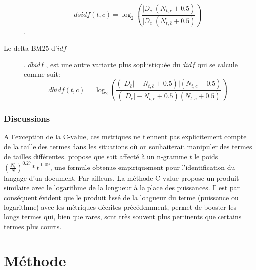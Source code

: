\begin{description}
    \[dsidf(t,c) = \log_2\left(\frac{\vert D_{\overline{c}} \vert (N_{t,c} + 0.5)}{\vert D_c \vert (N_{t,\overline{c}} + 0.5)}\right)\].
    \item[Le delta BM25 d'$idf$], $dbidf$ \citep{paltoglou2010dsidfANDdbidf}, est une autre variante plus sophistiquée du $didf$ qui se calcule comme suit:
    \[dbidf(t,c) = \log_2\left(\frac{( \vert D_{\overline{c}} \vert  - N_{t,\overline{c}} + 0.5) \vert (N_{t,c} + 0.5)}{(\vert D_c \vert - N_{t,c} + 0.5) (N_{t,\overline{c}} + 0.5)}\right)\]
\end{description}

\subsubsection{Discussions}

A l'exception de la $\text{C-value}$, ces métriques ne tiennent pas explicitement compte de la taille des termes dans les situations où on souhaiterait manipuler des termes de tailles différentes. \citep{brown2013ngram1100languages} propose que soit affecté à un n-gramme $t$ le poids $\left(\frac{N_t}{N}\right)^{0.27} * \vert t \vert^{0.09}$, une formule obtenue empiriquement pour l'identification du langage d'un document. Par ailleurs, La méthode $\text{C-value}$ \citep{frantzi2000CValueNCValue} propose un produit similaire avec le logarithme de la longueur à la place des puissances. Il est par conséquent évident que le produit lissé de la longueur du terme (puissance ou logarithme) avec les métriques décrites précédemment, permet de booster les longs termes qui, bien que rares, sont très souvent plus pertinents que certains termes plus courts. 


\section{Méthode}

